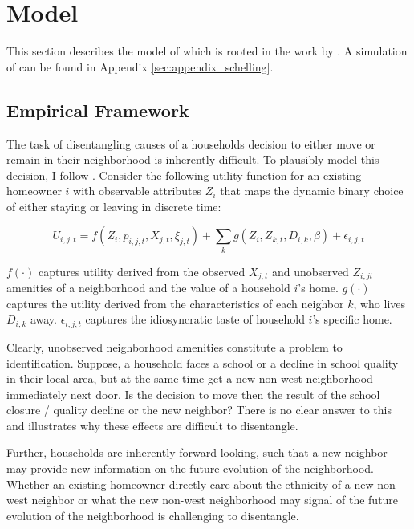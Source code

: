 \documentclass[../main.tex]{subfiles}
\begin{document}
\section{Model}
\label{sec:model}
This section describes the model of \textcite{Bayer_2022_nearest_neighbor} which is rooted in the work by \textcite{schelling1971dynamic}. A simulation of \textcite{schelling1971dynamic} can be found in Appendix \ref{sec:appendix_schelling}.

\subsection{Empirical Framework}
The task of disentangling causes of a households decision to either move or remain in their neighborhood is inherently difficult. To plausibly model this decision, I follow \textcite{Bayer_2022_nearest_neighbor}. Consider the following utility function for an existing homeowner $i$ with observable attributes $Z_i$ that maps the dynamic binary choice of either staying or leaving in discrete time:

\begin{equation}
    U_{i, j, t} = f(Z_i, p_{i, j, t}, X_{j, t}, \xi_{j,t }) + \sum_k g(Z_i, Z_{k, t}, D_{i, k}, \beta) + \epsilon_{i, j, t}
    \label{eq:utility_household_moving}
\end{equation}

$f(\cdot)$ captures utility derived from the observed $X_{j,t}$ and unobserved $Z_{i, jt}$ amenities of a neighborhood and the value of a household $i$'s home. $g(\cdot)$ captures the utility derived from the characteristics of each neighbor $k$, who lives $D_{i, k}$ away. $\epsilon_{i, j, t}$ captures the idiosyncratic taste of household $i$'s specific home. 

Clearly, unobserved neighborhood amenities constitute a problem to identification. Suppose, a household faces a school or a decline in school quality in their local area, but at the same time get a new non-west neighborhood immediately next door. Is the decision to move then the result of the school closure / quality decline or the new neighbor? There is no clear answer to this and illustrates why these effects are difficult to disentangle.

Further, households are inherently forward-looking, such that a new neighbor may provide new information on the future evolution of the neighborhood. Whether an existing homeowner directly care about the ethnicity of a new non-west neighbor or what the new non-west neighborhood may signal of the future evolution of the neighborhood is challenging to disentangle. 
\end{document}
